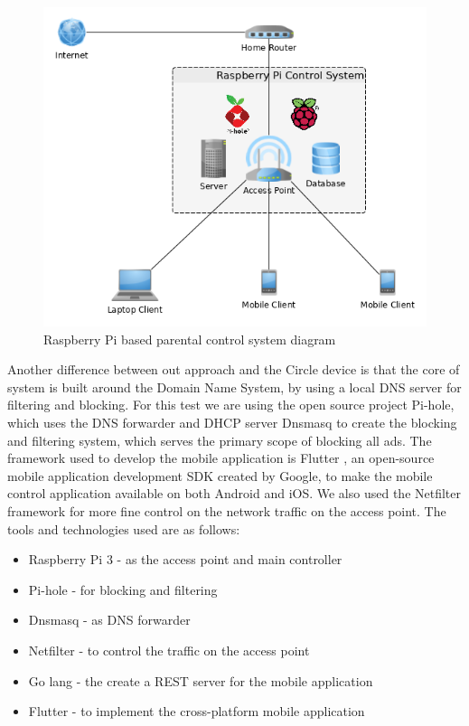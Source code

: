 \begin{figure}[th]
\centering
\includegraphics[width=1\textwidth]{Figures/system-diagram}
\decoRule
\caption{Raspberry Pi based parental control system diagram}
\label{fig:system-diagram}
\end{figure}

Another difference between out approach and the Circle device is that the core of system is built around the  Domain Name System, by using a local DNS server for filtering and blocking. For this test we are using the open source project Pi-hole, which uses the DNS forwarder and DHCP server Dnsmasq to create the blocking and filtering system, which serves the primary scope of blocking all ads. The framework used to develop the mobile application is Flutter \citep{flutterio}, an open-source mobile application development SDK created by Google, to make the mobile control application available on both Android and iOS. We also used the Netfilter framework for more fine control on the network traffic on the access point. The tools and technologies used are as follows:

\begin{itemize}
\item Raspberry Pi 3 - as the access point and main controller
\item Pi-hole - for blocking and filtering
\item Dnsmasq - as DNS forwarder
\item Netfilter - to control the traffic on the access point
\item Go lang - the create a REST server for the mobile application
\item Flutter - to implement the cross-platform mobile application
\end{itemize}

